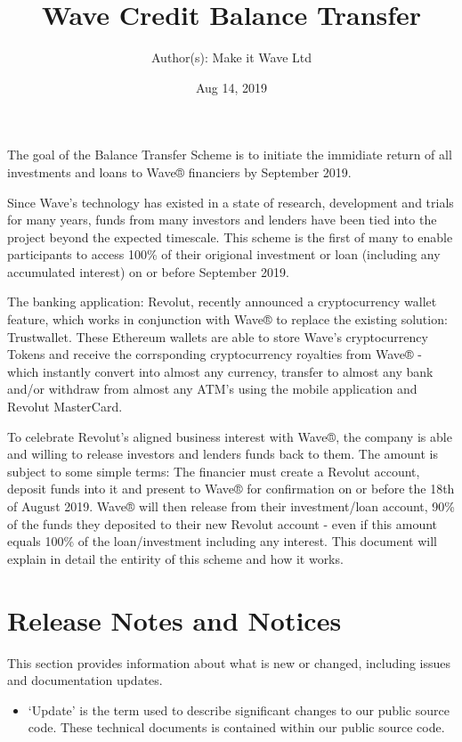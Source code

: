 \documentclass[letterpaper,10pt,openany,oneside,english]{sphinxmanual}
\title{Wave Credit Balance Transfer}
\date{Aug 14, 2019}
\author{Author(s): Make it Wave Ltd}
\begin{document}
\maketitle
\sphinxtableofcontents
{}\label{\detokenize{index::doc}}


The goal of the Balance Transfer Scheme is to initiate the immidiate return of all investments and loans to Wave® financiers by September 2019.

Since Wave’s technology has existed in a state of research, development and trials for many years, funds from many investors and lenders have been tied into the project beyond the expected timescale. This scheme is the first of many to enable participants to access 100\% of their origional investment or loan (including any accumulated interest) on or before September 2019.

The banking application: Revolut, recently announced a cryptocurrency wallet feature, which works in conjunction with Wave® to replace the existing solution: Trustwallet. These Ethereum wallets are able to store Wave’s cryptocurrency Tokens and receive the corrsponding cryptocurrency royalties from Wave® - which instantly convert into almost any currency, transfer to almost any bank and/or withdraw from almost any ATM’s using the mobile application and Revolut MasterCard.

To celebrate Revolut’s aligned business interest with Wave®, the company is able and willing to release investors and lenders funds back to them. The amount is subject to some simple terms: The financier must create a Revolut account, deposit funds into it and present to Wave® for confirmation on or before the 18th of August 2019. Wave® will then release from their investment/loan account, 90\% of the funds they deposited to their new Revolut account - even if this amount equals 100\% of the loan/investment including any interest. This document will explain in detail the entirity of this scheme and how it works.


\chapter{Release Notes and Notices}
\label{\detokenize{releasenotes:release-notes-and-notices}}\label{\detokenize{releasenotes::doc}}
This section provides information about what is new or changed, including issues and documentation updates.
\begin{itemize}
\item {} 
‘Update’ is the term used to describe significant changes to our public source code. These technical documents is contained within our public source code.

\end{itemize}
\end{document}
